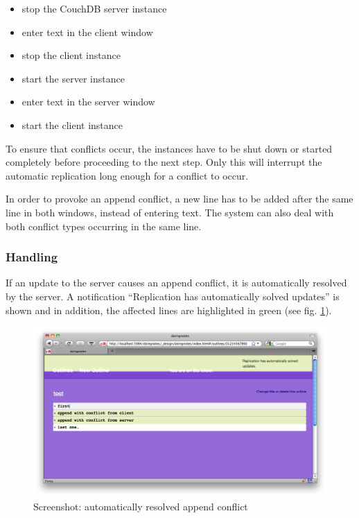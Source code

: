 \begin{itemize}
\item stop the CouchDB server instance
\item enter text in the client window
\item stop the client instance
\item start the server instance
\item enter text in the server window
\item start the client instance
\end{itemize}

To ensure that conflicts occur, the instances have to be shut down or started completely before proceeding to the next step. Only this will interrupt the automatic replication long enough for a conflict to occur.

In order to provoke an append conflict, a new line has to be added after the same line in both windows, instead of entering text. The system can also deal with both conflict types occurring in the same line.


\subsubsection{Handling}



If an update to the server causes an append conflict, it is automatically resolved by the server. A notification \enquote{Replication has automatically solved updates} is shown and in addition, the affected lines are highlighted in green (see fig. \ref{fig:appendconflict}).


\medskip
\begin{figure}[ht] 
  \begin{center}
  \includegraphics[width=\textwidth]{grafik/screenshot-append-conflict} 
  \end{center}
  \caption{Screenshot: automatically resolved append conflict}
  \label{fig:appendconflict}
\end{figure}



